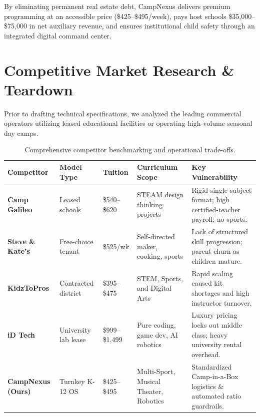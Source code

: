 \documentclass[11pt,a4paper]{article}
\begin{document}
By eliminating permanent real estate debt, CampNexus delivers premium programming at an accessible price (\$425--\$495/week), pays host schools \$35,000--\$75,000 in net auxiliary revenue, and ensures institutional child safety through an integrated digital command center.

\section{Competitive Market Research \& Teardown}

Prior to drafting technical specifications, we analyzed the leading commercial operators utilizing leased educational facilities or operating high-volume seasonal day camps.

\begin{table}[h!]
\centering
\small
\begin{tabularx}{\textwidth}{p{2.6cm} p{2.2cm} p{1.8cm} p{3.2cm} X}
\toprule
\textbf{Competitor} & \textbf{Model Type} & \textbf{Tuition} & \textbf{Curriculum Scope} & \textbf{Key Vulnerability} \\
\midrule
\textbf{Camp Galileo} & Leased schools & \$540--\$620 & STEAM design thinking projects & Rigid single-subject format; high certified-teacher payroll; no sports. \\
\addlinespace
\textbf{Steve \& Kate's} & Free-choice tenant & \$525/wk & Self-directed maker, cooking, sports & Lack of structured skill progression; parent churn as children mature. \\
\addlinespace
\textbf{KidzToPros} & Contracted district & \$395--\$475 & STEM, Sports, and Digital Arts & Rapid scaling caused kit shortages and high instructor turnover. \\
\addlinespace
\textbf{iD Tech} & University lab lease & \$999--\$1,499 & Pure coding, game dev, AI robotics & Luxury pricing locks out middle class; heavy university rental overhead. \\
\addlinespace
\textbf{CampNexus (Ours)} & Turnkey K-12 OS & \$425--\$495 & Multi-Sport, Musical Theater, Robotics & Standardized Camp-in-a-Box logistics \& automated ratio guardrails. \\
\bottomrule
\end{tabularx}
\caption{Comprehensive competitor benchmarking and operational trade-offs.}
\label{tab:competitors}
\end{table}
\end{document}
